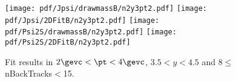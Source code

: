 \begin{figure}[H]
\begin{center}
\texttt{[image: pdf/Jpsi/drawmassB/n2y3pt2.pdf]}
\texttt{[image: pdf/Jpsi/2DFitB/n2y3pt2.pdf]}
\vspace*{-0.5cm}
\texttt{[image: pdf/Psi2S/drawmassB/n2y3pt2.pdf]}
\texttt{[image: pdf/Psi2S/2DFitB/n2y3pt2.pdf]}
\vspace*{-0.5cm}
\end{center}
\caption{Fit results in $2\gevc<\pt<4\gevc$, $3.5<y<4.5$ and 8$\leq$nBackTracks$<$15.}
\label{Fitn2y3pt2}
\end{figure}
